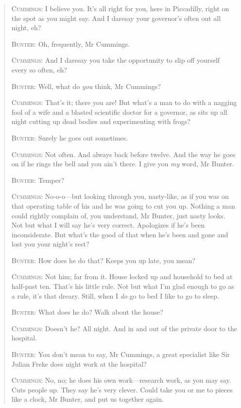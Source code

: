 \begin{quotation}
\textsc{Cummings}: I believe you. It’s all right for you, here in Piccadilly, right on the spot as you might say. And I daresay your governor’s often out all night, eh?

\textsc{Bunter}: Oh, frequently, Mr Cummings.

\textsc{Cummings}: And I daresay you take the opportunity to slip off yourself every so often, eh?

\textsc{Bunter}: Well, what do \textit{you} think, Mr Cummings?

\textsc{Cummings}: That’s it; there you are! But what’s a man to do with a nagging fool of a wife and a blasted scientific doctor for a governor, as sits up all night cutting up dead bodies and experimenting with frogs?

\textsc{Bunter}: Surely he goes out sometimes.

\textsc{Cummings}: Not often. And always back before twelve. And the way he goes on if he rings the bell and you ain’t there. I give you \textit{my} word, Mr Bunter.

\textsc{Bunter}: Temper?

\textsc{Cummings}: No-o-o\allowbreak---\allowbreak but looking through you, nasty-like, as if you was on that operating table of his and he was going to cut you up. Nothing a man could rightly complain of, you understand, Mr Bunter, just nasty looks. Not but what I will say he’s very correct. Apologizes if he’s been inconsiderate. But what’s the good of that when he’s been and gone and lost you your night’s rest?

\textsc{Bunter}: How does he do that? Keeps you up late, you mean?

\textsc{Cummings}: Not him; far from it. House locked up and household to bed at half-past ten. That’s his little rule. Not but what I’m glad enough to go as a rule, it’s that dreary. Still, when I \textit{do} go to bed I like to go to sleep.

\textsc{Bunter}: What does he do? Walk about the house?

\textsc{Cummings}: Doesn’t he? All night. And in and out of the private door to the hospital.

\textsc{Bunter}: You don’t mean to say, Mr Cummings, a great specialist like Sir Julian Freke does night work at the hospital?

\textsc{Cummings}: No, no; he does his own work\allowbreak---\allowbreak research work, as you may say. Cuts people up. They say he’s very clever. Could take you or me to pieces like a clock, Mr Bunter, and put us together again.


\end{quotation}
